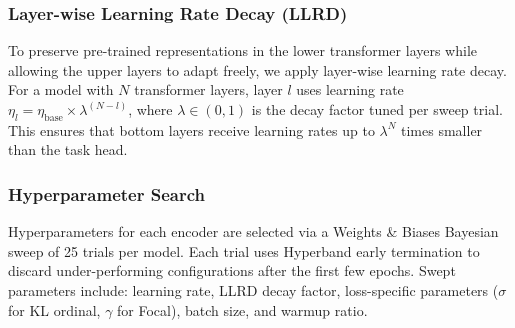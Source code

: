 \subsubsection{Layer-wise Learning Rate Decay (LLRD)}

To preserve pre-trained representations in the lower transformer layers
while allowing the upper layers to adapt freely, we apply layer-wise
learning rate decay. For a model with $N$ transformer layers, layer $l$
uses learning rate $\eta_l = \eta_{\mathrm{base}} \times
\lambda^{(N-l)}$, where $\lambda \in (0,1)$ is the decay factor tuned
per sweep trial. This ensures that bottom layers receive learning rates
up to $\lambda^N$ times smaller than the task head.

\subsubsection{Hyperparameter Search}

Hyperparameters for each encoder are selected via a Weights \& Biases
Bayesian sweep of 25 trials per model. Each trial uses Hyperband early
termination to discard under-performing configurations after the first
few epochs. Swept parameters include: learning rate, LLRD decay factor,
loss-specific parameters ($\sigma$ for KL ordinal, $\gamma$ for Focal),
batch size, and warmup ratio.
